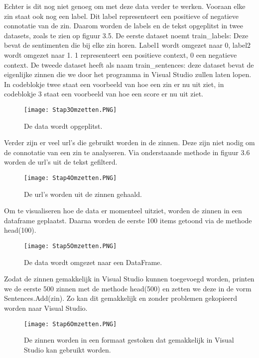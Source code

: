 Echter is dit nog niet genoeg om met deze data verder te werken. Vooraan elke zin staat ook nog een label. Dit label representeert een positieve of negatieve connotatie van de zin. Daarom worden de labels en de tekst opgeplitst in twee datasets, zoals te zien op figuur 3.5. De eerste dataset noemt train\_labels: Deze bevat de sentimenten die bij elke zin horen. Label1 wordt omgezet naar 0, label2 wordt omgezet naar 1. 1 representeert een positieve context, 0 een negatieve context. De tweede dataset heeft als naam train\_sentences: deze dataset bevat de eigenlijke zinnen die we door het programma in Visual Studio zullen laten lopen. In codeblokje twee staat een voorbeeld van hoe een zin er nu uit ziet, in codeblokje 3 staat een voorbeeld van hoe een score er nu uit ziet. 

\begin{figure}[!htbp]
    \texttt{[image: Stap3Omzetten.PNG]}
    \caption{\label{stap3amazon}De data wordt opgeplitst.}
\end{figure}
\FloatBarrier

Verder zijn er veel url's die gebruikt worden in de zinnen. Deze zijn niet nodig om de connotatie van een zin te analyseren. Via onderstaande methode in figuur 3.6 worden de url's uit de tekst gefilterd.

\begin{figure}[!htbp]
    \texttt{[image: Stap4Omzetten.PNG]}
    \caption{\label{stap4amazon}De url's worden uit de zinnen gehaald.}
\end{figure}
\FloatBarrier

Om te visualiseren hoe de data er momenteel uitziet, worden de zinnen in een dataframe geplaatst. Daarna worden de eerste 100 items getoond via de methode head(100).

\begin{figure}[!htbp]
    \texttt{[image: Stap5Omzetten.PNG]}
    \caption{\label{stap5amazon}De data wordt omgezet naar een DataFrame.}
\end{figure}
\FloatBarrier

Zodat de zinnen gemakkelijk in Visual Studio kunnen toegevoegd worden, printen we de eerste 500 zinnen met de methode head(500) en zetten we deze in de vorm Sentences.Add(zin). Zo kan dit gemakkelijk en zonder problemen gekopieerd worden naar Visual Studio.

\begin{figure}[!htbp]
    \texttt{[image: Stap6Omzetten.PNG]}
    \caption{\label{stap6amazon}De zinnen worden in een formaat gestoken dat gemakkelijk in Visual Studio kan gebruikt worden.}
\end{figure}
\FloatBarrier

